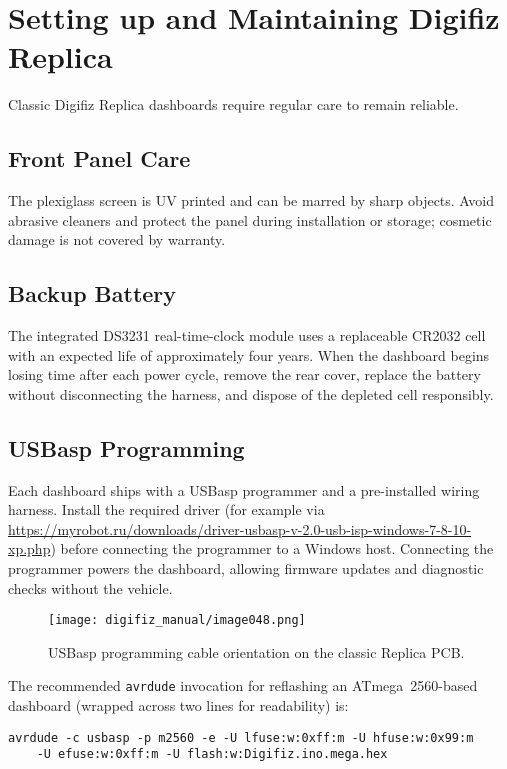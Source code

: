 \chapter{Setting up and Maintaining Digifiz Replica} \label{ch:replica-setup}

Classic Digifiz Replica dashboards require regular care to remain reliable.

\section{Front Panel Care}

The plexiglass screen is UV printed and can be marred by sharp objects.
Avoid abrasive cleaners and protect the panel during installation or storage; cosmetic damage is not covered by warranty.

\section{Backup Battery}

The integrated DS3231 real-time-clock module uses a replaceable CR2032 cell with an expected life of approximately four years.
When the dashboard begins losing time after each power cycle, remove the rear cover, replace the battery without disconnecting the harness, and dispose of the depleted cell responsibly.

\section{USBasp Programming}

Each dashboard ships with a USBasp programmer and a pre-installed wiring harness.
Install the required driver (for example via \url{https://myrobot.ru/downloads/driver-usbasp-v-2.0-usb-isp-windows-7-8-10-xp.php}) before connecting the programmer to a Windows host.
Connecting the programmer powers the dashboard, allowing firmware updates and diagnostic checks without the vehicle.

\begin{figure}[htbp]
    \centering
    \texttt{[image: digifiz\_manual/image048.png]}
    \caption{USBasp programming cable orientation on the classic Replica PCB.}
    \label{fig:usbasp-orientation}
\end{figure}

The recommended \texttt{avrdude} invocation for reflashing an ATmega~2560-based dashboard (wrapped across two lines for readability) is:
\begin{verbatim}
avrdude -c usbasp -p m2560 -e -U lfuse:w:0xff:m -U hfuse:w:0x99:m
    -U efuse:w:0xff:m -U flash:w:Digifiz.ino.mega.hex
\end{verbatim}

